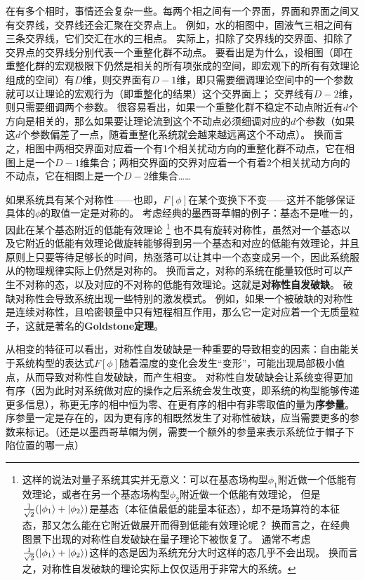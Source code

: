 \documentclass[hyperref, UTF8, a4paper]{ctexart}
\begin{document}
在有多个相时，事情还会复杂一些。每两个相之间有一个界面，界面和界面之间又有交界线，交界线还会汇聚在交界点上。
例如，水的相图中，固液气三相之间有三条交界线，它们交汇在水的三相点。
实际上，扣除了交界线的交界面、扣除了交界点的交界线分别代表一个重整化群不动点。
要看出是为什么，设相图（即在重整化群的宏观极限下仍然是相关的所有项张成的空间，即宏观下的所有有效理论组成的空间）有$D$维，则交界面有$D-1$维，即只需要细调理论空间中的一个参数就可以让理论的宏观行为（即重整化的结果）这个交界面上；
交界线有$D-2$维，则只需要细调两个参数。
很容易看出，如果一个重整化群不稳定不动点附近有$d$个方向是相关的，那么如果要让理论流到这个不动点必须细调对应的$d$个参数（如果这$d$个参数偏差了一点，随着重整化系统就会越来越远离这个不动点）。
换而言之，相图中两相交界面对应着一个有1个相关扰动方向的重整化群不动点，它在相图上是一个$D-1$维集合；两相交界面的交界对应着一个有着2个相关扰动方向的不动点，它在相图上是一个$D-2$维集合……

如果系统具有某个对称性——也即，$F[\phi]$在某个变换下不变——这并不能够保证具体的$\phi$的取值一定是对称的。
考虑经典的墨西哥草帽的例子：基态不是唯一的，因此在某个基态附近的低能有效理论%
\footnote{这样的说法对量子系统其实并无意义：可以在基态场构型$\phi_1$附近做一个低能有效理论，或者在另一个基态场构型$\phi_2$附近做一个低能有效理论，
但是$\frac{1}{\sqrt{2}} (\ket{\phi_1} + \ket{\phi_2})$是基态（本征值最低的能量本征态），却不是场算符的本征态，那又怎么能在它附近做展开而得到低能有效理论呢？
换而言之，在经典图景下出现的对称性自发破缺在量子理论下被恢复了。
通常不考虑$\frac{1}{\sqrt{2}} (\ket{\phi_1} + \ket{\phi_2})$这样的态是因为系统充分大时这样的态几乎不会出现。
换而言之，对称性自发破缺的理论实际上仅仅适用于非常大的系统。
}%
也不具有旋转对称性，虽然对一个基态以及它附近的低能有效理论做旋转能够得到另一个基态和对应的低能有效理论，并且原则上只要等待足够长的时间，热涨落可以让其中一个态变成另一个，因此系统服从的物理规律实际上仍然是对称的。
换而言之，对称的系统在能量较低时可以产生不对称的态，以及对应的不对称的低能有效理论。这就是\textbf{对称性自发破缺}。
破缺对称性会导致系统出现一些特别的激发模式。
例如，如果一个被破缺的对称性是连续对称性，且哈密顿量中只有短程相互作用，那么它一定对应着一个无质量粒子，这就是著名的\textbf{Goldstone定理}。

从相变的特征可以看出，对称性自发破缺是一种重要的导致相变的因素：自由能关于系统构型的表达式$F[\phi]$随着温度的变化会发生“变形”，可能出现局部极小值点，从而导致对称性自发破缺，而产生相变。
对称性自发破缺会让系统变得更加有序（因为此时对系统做对应的操作之后系统会发生改变，即系统的构型能够传递更多信息），称更无序的相中恒为零、在更有序的相中有非零取值的量为\textbf{序参量}。
序参量一定是存在的，因为更有序的相既然发生了对称性破缺，应当需要更多的参数来标记。（还是以墨西哥草帽为例，需要一个额外的参量来表示系统位于帽子下陷位置的哪一点）
\end{document}
